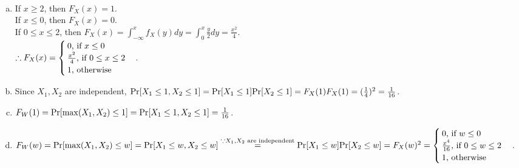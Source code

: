 \begin{pr}$ $
\begin{enumerate}[(a)]
\item If $x\geq2$, then $F_X(x)=1$.\\
If $x\leq0$, then $F_X(x)=0$.\\
If $0\leq x\leq 2$, then $F_X(x)=\int_{-\infty}^xf_X(y)dy=\int_0^x\frac y2dy=\frac{x^2}4$.\\
$\so F_X(x)=\begin{cases}
0\text{, if }x\leq0\\
\frac{x^2}4\text{, if }0\leq x\leq2\\
1\text{, otherwise}
\end{cases}$.
\item Since $X_1, X_2$ are independent, $\P[X_1\leq1, X_2\leq1]=\P[X_1\leq1]\P[X_2\leq1]=F_X(1)F_X(1)=(\frac14)^2=\frac1{16}$.
\item $F_W(1)=\P[\max(X_1, X_2)\leq1]=\P[X_1\leq1, X_2\leq1]=\frac1{16}$.
\item $F_W(w)=\P[\max(X_1, X_2)\leq w]=\P[X_1\leq w, X_2\leq w]\\
\overset{\cuz X_1, X_2\text{ are independent}}=\P[X_1\leq w]\P[X_2\leq w]=F_X(w)^2=\begin{cases}
0\text{, if }w\leq0\\
\frac{x^4}{16}\text{, if }0\leq w\leq2\\
1\text{, otherwise}
\end{cases}$.
\end{enumerate}
\end{pr}

